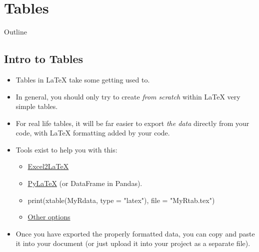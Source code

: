 \documentclass[usenames,dvipsnames]{beamer}
\begin{document}
\section{Tables}


\begin{frame}{Outline}
\begin{multicols}{2}
\tableofcontents[currentsection]
\end{multicols}
\end{frame}
\subsection{Intro to Tables}
\begin{frame}[fragile]{\insertsubsection}
\begin{itemize}
\item Tables in \LaTeX{} take some getting used to.
\item In general, you should only try to create {\em from scratch} within \LaTeX{} very simple tables. 
\item For real life tables, it will be far easier to export {\em the data} directly from your code, with \LaTeX{} formatting added by your code.
\item Tools exist to help you with this: 
\begin{itemize}
\item \href{https://www.ctan.org/tex-archive/support/excel2latex/}{Excel2\LaTeX{}}
\item \href{https://jeltef.github.io/PyLaTeX/current/}{Py\LaTeX{}} (or DataFrame in Pandas).
\item print(xtable(MyRdata, type = "latex"), file = "MyRtab.tex")
\item \href{https://en.wikibooks.org/wiki/LaTeX/Tables#Using_spreadsheets_and_data_analysis_tools}{Other options}
\end{itemize}
\item Once you have exported the properly formatted data, you can copy and paste it into your document (or just upload it into your project as a separate file).  
\end{itemize}
\end{frame}
\end{document}
